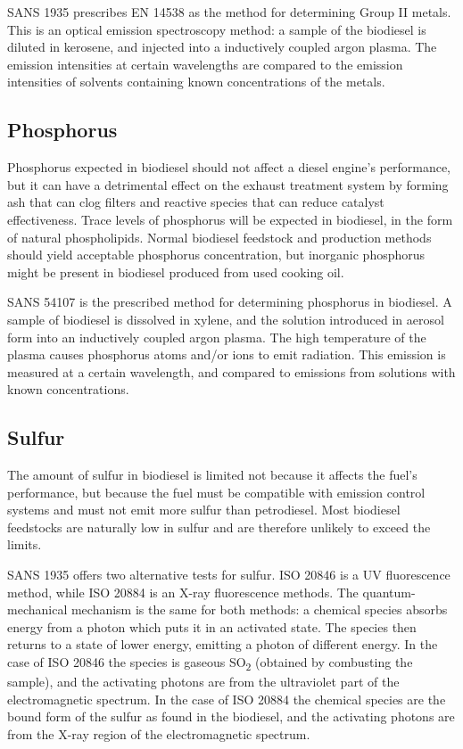 SANS 1935 prescribes EN 14538 as the method for determining Group II metals.
This is an optical emission spectroscopy method: a sample of the biodiesel is
diluted in kerosene, and injected into a inductively coupled argon plasma. The
emission intensities at certain wavelengths are compared to the emission
intensities of solvents containing known concentrations of the metals.

\subsection{Phosphorus}

Phosphorus expected in biodiesel should not affect a diesel engine's
performance, but it can have a detrimental effect on the exhaust treatment
system by forming ash that can clog filters and reactive species that can reduce
catalyst effectiveness. Trace levels of phosphorus will be expected in
biodiesel, in the form of natural phospholipids. Normal biodiesel feedstock and
production methods should yield acceptable phosphorus concentration, but
inorganic phosphorus might be present in biodiesel produced from used cooking
oil.
 
SANS 54107 is the prescribed method for determining phosphorus in biodiesel. A
sample of biodiesel is dissolved in xylene, and the solution introduced in
aerosol form into an inductively coupled argon plasma. The high temperature of
the plasma causes phosphorus atoms and/or ions to emit radiation. This emission
is measured at a certain wavelength, and compared to emissions from solutions
with known concentrations.

\subsection{Sulfur}

The amount of sulfur in biodiesel is limited not because it affects the fuel's
performance, but because the fuel must be compatible with emission control
systems and must not emit more sulfur than petrodiesel. Most biodiesel
feedstocks are naturally low in sulfur and are therefore unlikely to exceed the
limits.

SANS 1935 offers two alternative tests for sulfur. ISO 20846 is a UV
fluorescence method, while ISO 20884 is an X-ray fluorescence methods. The
quantum-mechanical mechanism is the same for both methods: a chemical species
absorbs energy from a photon which puts it in an activated state. The species
then returns to a state of lower energy, emitting a photon of different energy.
In the case of ISO 20846 the species is gaseous SO\textsubscript{2} (obtained by
combusting the sample), and the activating photons are from the ultraviolet part
of the electromagnetic spectrum. In the case of ISO 20884 the chemical species
are the bound form of the sulfur as found in the biodiesel, and the activating
photons are from the X-ray region of the electromagnetic spectrum.


